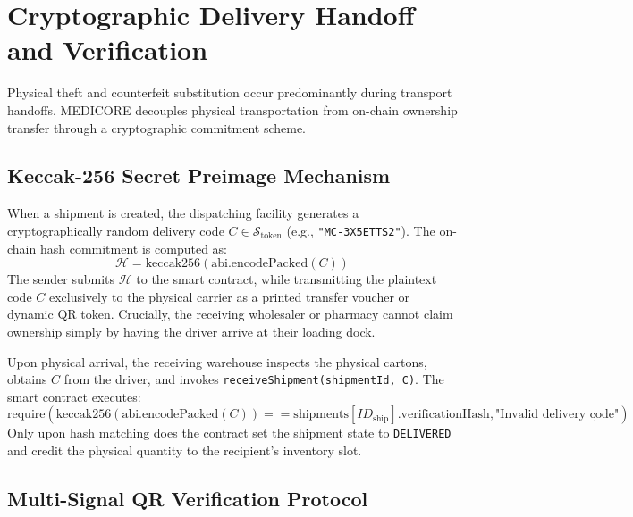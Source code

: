 \documentclass[pdflatex,sn-mathphys-num]{sn-jnl}
\theoremstyle{thmstyleone}
\theoremstyle{thmstyletwo}
\theoremstyle{thmstylethree}
\begin{document}

\section{Cryptographic Delivery Handoff and Verification}\label{sec:crypto-handoff}

Physical theft and counterfeit substitution occur predominantly during transport handoffs. MEDICORE decouples physical transportation from on-chain ownership transfer through a cryptographic commitment scheme.

\subsection{Keccak-256 Secret Preimage Mechanism}

When a shipment is created, the dispatching facility generates a cryptographically random delivery code $C \in \mathcal{S}_{\text{token}}$ (e.g., \texttt{"MC-3X5ETTS2"}). The on-chain hash commitment is computed as:
\begin{equation}
\mathcal{H} = \text{keccak256}(\text{abi.encodePacked}(C))
\end{equation}
The sender submits $\mathcal{H}$ to the smart contract, while transmitting the plaintext code $C$ exclusively to the physical carrier as a printed transfer voucher or dynamic QR token. Crucially, the receiving wholesaler or pharmacy cannot claim ownership simply by having the driver arrive at their loading dock.

Upon physical arrival, the receiving warehouse inspects the physical cartons, obtains $C$ from the driver, and invokes \texttt{receiveShipment(shipmentId, C)}. The smart contract executes:
\begin{equation}
\text{require}(\text{keccak256}(\text{abi.encodePacked}(C)) == \text{shipments}[ID_{\text{ship}}].\text{verificationHash}, \text{"Invalid delivery code"});
\end{equation}
Only upon hash matching does the contract set the shipment state to \texttt{DELIVERED} and credit the physical quantity to the recipient's inventory slot.

\subsection{Multi-Signal QR Verification Protocol}
\end{document}
